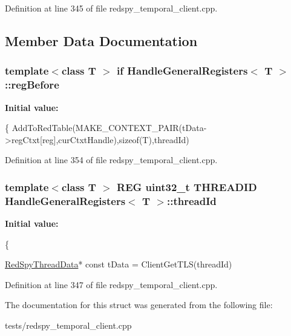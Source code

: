 Definition at line 345 of file redspy\-\_\-temporal\-\_\-client.\-cpp.



\subsection{Member Data Documentation}
\hypertarget{structHandleGeneralRegisters_ae44164656bd477ab58ac4a5c4b79f5ee}{
\subsubsection[{reg\-Before}]{\setlength{\rightskip}{0pt plus 5cm}template$<$class T $>$ if {\bf Handle\-General\-Registers}$<$ T $>$\-::reg\-Before}}\label{structHandleGeneralRegisters_ae44164656bd477ab58ac4a5c4b79f5ee}
{\bfseries Initial value\-:}
\begin{DoxyCode}
\{
            AddToRedTable(MAKE\_CONTEXT\_PAIR(tData->regCtxt[reg],curCtxtHandle),\textcolor{keyword}{sizeof}(T),threadId)
\end{DoxyCode}


Definition at line 354 of file redspy\-\_\-temporal\-\_\-client.\-cpp.

\hypertarget{structHandleGeneralRegisters_a1c358ea1f32751b2b7d8aaef2bd24f3b}{
\subsubsection[{thread\-Id}]{\setlength{\rightskip}{0pt plus 5cm}template$<$class T $>$ R\-E\-G uint32\-\_\-t T\-H\-R\-E\-A\-D\-I\-D {\bf Handle\-General\-Registers}$<$ T $>$\-::thread\-Id}}\label{structHandleGeneralRegisters_a1c358ea1f32751b2b7d8aaef2bd24f3b}
{\bfseries Initial value\-:}
\begin{DoxyCode}
\{
        
        \hyperlink{structRedSpyThreadData}{RedSpyThreadData}* \textcolor{keyword}{const} tData = ClientGetTLS(threadId)
\end{DoxyCode}


Definition at line 347 of file redspy\-\_\-temporal\-\_\-client.\-cpp.



The documentation for this struct was generated from the following file\-:\begin{DoxyCompactItemize}
\item 
tests/redspy\-\_\-temporal\-\_\-client.\-cpp\end{DoxyCompactItemize}
